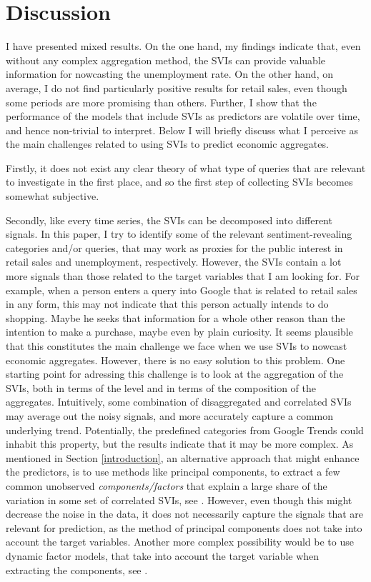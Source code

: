 \section{Discussion}\label{discussion}

I have presented mixed results. On the one hand, my findings indicate that, even without any complex aggregation method, the SVIs can provide valuable information for nowcasting the unemployment rate. On the other hand, on average, I do not find particularly positive results for retail sales, even though some periods are more promising than others. Further, I show that the performance of the models that include SVIs as predictors are volatile over time, and hence non-trivial to interpret. Below I will briefly discuss what I perceive as the main challenges related to using SVIs to predict economic aggregates.

Firstly, it does not exist any clear theory of what type of queries that are relevant to investigate in the first place, and so the first step of collecting SVIs becomes somewhat subjective. 

Secondly, like every time series, the SVIs can be decomposed into different signals. In this paper, I try to identify some of the relevant sentiment-revealing categories and/or queries, that may work as proxies for the public interest in retail sales and unemployment, respectively. However, the SVIs contain a lot more signals than those related to the target variables that I am looking for. For example, when a person enters a query into Google that is related to retail sales in any form, this may not indicate that this person actually intends to do shopping. Maybe he seeks that information for a whole other reason than the intention to make a purchase, maybe even by plain curiosity. It seems plausible that this constitutes the main challenge we face when we use SVIs to nowcast economic aggregates. However, there is no easy solution to this problem. One starting point for adressing this challenge is to look at the aggregation of the SVIs, both in terms of the level and in terms of the composition of the aggregates. Intuitively, some combination of disaggregated and correlated SVIs may average out the noisy signals, and more accurately capture a common underlying trend. Potentially, the predefined categories from Google Trends could inhabit this property, but the results indicate that it may be more complex. As mentioned in Section \ref{introduction}, an alternative approach that might enhance the predictors, is to use methods like principal components, to extract a few common unobserved \textit{components/factors} that explain a large share of the variation in some set of correlated SVIs, see \textcite{vosen2012}. However, even though this might decrease the noise in the data, it does not necessarily capture the signals that are relevant for prediction, as the method of principal components does not take into account the target variables. Another more complex possibility would be to use dynamic factor models, that take into account the target variable when extracting the components, see \textcite{forni2000}.

